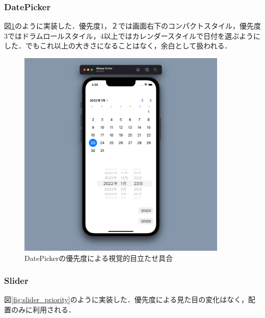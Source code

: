 \subsubsection{DatePicker}
図\ref{fig:datepicker_priority}のように実装した．優先度1，２では画面右下のコンパクトスタイル，優先度3ではドラムロールスタイル，4以上ではカレンダースタイルで日付を選ぶようにした．でもこれ以上の大きさになることはなく，余白として扱われる．

\begin{figure}[htbp]
  \begin{minipage}{\hsize}
    \begin{center}
       \includegraphics[width=100mm]{img/DatePicker_priority.png}
    \end{center}
    \caption{DatePickerの優先度による視覚的目立たせ具合}
    \label{fig:datepicker_priority}
  \end{minipage}
\end{figure}

\subsubsection{Slider}
図\ref{fig:slider_priority}のように実装した．優先度による見た目の変化はなく，配置のみに利用される．

